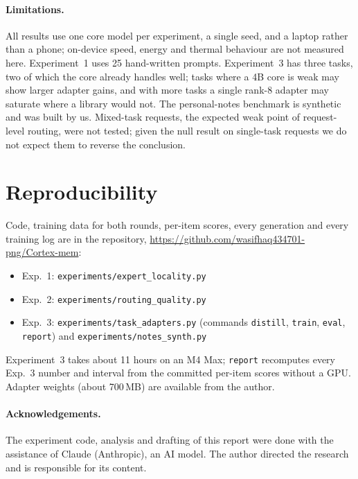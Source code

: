 \documentclass[11pt]{article}
\newcommand{\repourl}{https://github.com/wasifhaq434701-png/Cortex-mem}
\begin{document}
\paragraph{Limitations.} All results use one core model per experiment, a single seed, and a laptop rather
than a phone; on-device speed, energy and thermal behaviour are not measured here. Experiment~1 uses 25
hand-written prompts. Experiment~3 has three tasks, two of which the core already handles well; tasks
where a 4B core is weak may show larger adapter gains, and with more tasks a single rank-8 adapter may
saturate where a library would not. The personal-notes benchmark is synthetic and was built by us.
Mixed-task requests, the expected weak point of request-level routing, were not tested; given the null
result on single-task requests we do not expect them to reverse the conclusion.

\section{Reproducibility}
Code, training data for both rounds, per-item scores, every generation and every training log are in the
repository, \url{\repourl}:
\begin{itemize}\raggedright
\item Exp.~1: \texttt{experiments/expert\_locality.py}
\item Exp.~2: \texttt{experiments/routing\_quality.py}
\item Exp.~3: \texttt{experiments/task\_adapters.py} (commands \texttt{distill}, \texttt{train},
\texttt{eval}, \texttt{report}) and \texttt{experiments/notes\_synth.py}
\end{itemize}
Experiment~3 takes about 11 hours on an M4 Max; \texttt{report} recomputes every Exp.~3 number and
interval from the committed per-item scores without a GPU. Adapter weights (about 700\,MB) are available
from the author.

\paragraph{Acknowledgements.} The experiment code, analysis and drafting of this report were done with the
assistance of Claude (Anthropic), an AI model. The author directed the research and is responsible for
its content.
\end{document}
